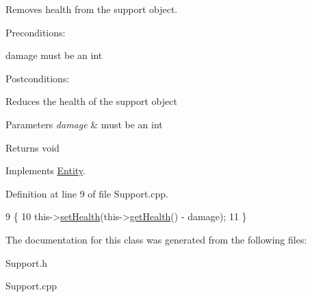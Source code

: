 Removes health from the support object. 

Preconditions\+:
\begin{DoxyItemize}
\item damage must be an int
\end{DoxyItemize}

Postconditions\+:
\begin{DoxyItemize}
\item Reduces the health of the support object
\end{DoxyItemize}


\begin{DoxyParams}{Parameters}
{\em damage} & must be an int \\
\hline
\end{DoxyParams}
\begin{DoxyReturn}{Returns}
void 
\end{DoxyReturn}


Implements \hyperlink{classEntity}{Entity}.



Definition at line 9 of file Support.\+cpp.


\begin{DoxyCode}
9                                    \{
10     this->\hyperlink{classEntity_a7dae281ff92be9bc98672cafe05c77ab}{setHealth}(this->\hyperlink{classEntity_a2b0140ae8c77c0e3654b070ee3c7fe57}{getHealth}() - damage);
11 \}
\end{DoxyCode}


The documentation for this class was generated from the following files\+:\begin{DoxyCompactItemize}
\item 
Support.\+h\item 
Support.\+cpp\end{DoxyCompactItemize}
